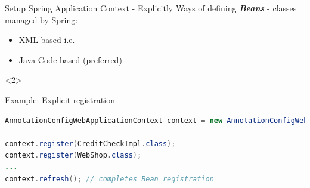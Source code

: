 \begin{frame}[fragile]{Setup Spring Application Context - Explicitly}
Ways of defining \textbf{\emph{Beans}} - classes managed by Spring:
\begin{itemize}
	\item XML-based i.e. 
	\item Java Code-based (preferred)
\end{itemize}
\vfill
\begin{visibleenv}<2>
\begin{block}{Example: Explicit registration}
\begin{lstlisting}[language=Java]
AnnotationConfigWebApplicationContext context = new AnnotationConfigWebApplicationContext();

context.register(CreditCheckImpl.class);
context.register(WebShop.class);
...
context.refresh(); // completes Bean registration
\end{lstlisting}
\vspace{-5mm}	
\end{block}
\end{visibleenv}
\end{frame}


